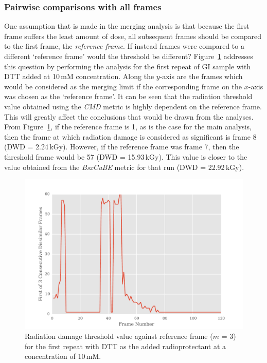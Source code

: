 \subsubsection{Pairwise comparisons with all frames}
\label{subs:Pairwise comparisons with all frames}
One assumption that is made in the merging analysis is that because the first frame suffers the least amount of dose, all subsequent frames should be compared to the first frame, the \textit{reference frame}.
If instead frames were compared to a different `reference frame' would the threshold be different?
Figure~\ref{fig:First n diff frames - DTT} addresses this question by performing the analysis for the first repeat of GI sample with DTT added at 10$\,$mM concentration.
Along the $y$-axis are the frames which would be considered as the merging limit if the corresponding frame on the $x$-axis was chosen as the `reference frame'.
It can be seen that the radiation threshold value obtained using the \textit{CMD} metric is highly dependent on the reference frame.
This will greatly affect the conclusions that would be drawn from the analyses.
From Figure~\ref{fig:First n diff frames - DTT}, if the reference frame is 1, as is the case for the main analysis, then the frame at which radiation damage is considered as significant is frame 8 (DWD = 2.24$\,$kGy).
However, if the reference frame was frame 7, then the threshold frame would be 57 (DWD = 15.93\,kGy).
This value is closer to the value obtained from the \textit{BsxCuBE} metric for that run (DWD = 22.92\,kGy).
\begin{figure}
    \centering
    \includegraphics[width=1.0\textwidth]{figures/saxs/dtt_first_n_plot.pdf}
    \caption{Radiation damage threshold value against reference frame ($m$ = 3) for the first repeat with DTT as the added radioprotectant at a concentration of 10\,mM.}
    \label{fig:First n diff frames - DTT}
\end{figure}

